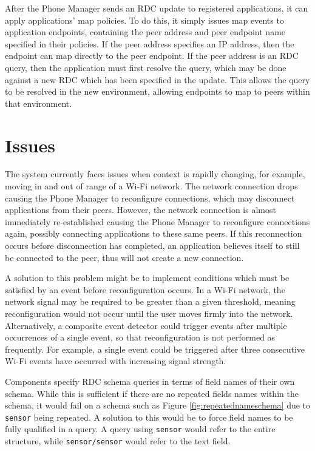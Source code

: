 \documentclass[12pt,twoside,notitlepage]{report}
\begin{document}
After the Phone Manager sends an RDC update to registered applications, it can apply applications' map policies. 
To do this, it simply issues map events to application endpoints, containing the peer address and peer endpoint name specified in their policies. 
If the peer address specifies an IP address, then the endpoint can map directly to the peer endpoint. 
If the peer address is an RDC query, then the application must first resolve the query, which may be done against a new RDC which has been specified in the update. 
This allows the query to be resolved in the new environment, allowing endpoints to map to peers within that environment. 


\section{Issues}
The system currently faces issues when context is rapidly changing, for example, moving in and out of range of a Wi-Fi network. 
The network connection drops causing the Phone Manager to reconfigure connections, which may disconnect applications from their peers.
However, the network connection is almost immediately re-established causing the Phone Manager to reconfigure connections again, possibly connecting applications to these same peers. 
If this reconnection occurs before disconnection has completed, an application believes itself to still be connected to the peer, thus will not create a new connection.

A solution to this problem might be to implement conditions which must be satisfied by an event before reconfiguration occurs. 
In a Wi-Fi network, the network signal may be required to be greater than a given threshold, meaning reconfiguration would not occur until the user moves firmly into the network. 
Alternatively, a composite event detector could trigger events after multiple occurrences of a single event, so that reconfiguration is not performed as frequently. 
For example, a single event could be triggered after three consecutive Wi-Fi events have occurred with increasing signal strength. 

Components specify RDC schema queries in terms of field names of their own schema.
While this is sufficient if there are no repeated fields names within the schema, it would fail on a schema such as Figure \ref{fig:repeatednameschema} due to {\tt sensor} being repeated. 
A solution to this would be to force field names to be fully qualified in a query. 
A query using {\tt sensor} would refer to the entire structure, while {\tt sensor/sensor} would refer to the text field.
\end{document}
